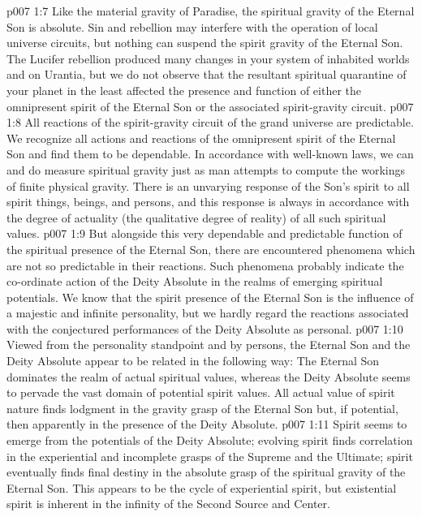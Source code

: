 \vs p007 1:7 \pc Like the material gravity of Paradise, the spiritual gravity of the Eternal Son is absolute. Sin and rebellion may interfere with the operation of local universe circuits, but nothing can suspend the spirit gravity of the Eternal Son. The Lucifer rebellion produced many changes in your system of inhabited worlds and on Urantia, but we do not observe that the resultant spiritual quarantine of your planet in the least affected the presence and function of either the omnipresent spirit of the Eternal Son or the associated spirit\hyp{}gravity circuit.
\vs p007 1:8 \pc All reactions of the spirit\hyp{}gravity circuit of the grand universe are predictable. We recognize all actions and reactions of the omnipresent spirit of the Eternal Son and find them to be dependable. In accordance with well\hyp{}known laws, we can and do measure spiritual gravity just as man attempts to compute the workings of finite physical gravity. There is an unvarying response of the Son’s spirit to all spirit things, beings, and persons, and this response is always in accordance with the degree of actuality (the qualitative degree of reality) of all such spiritual values.
\vs p007 1:9 But alongside this very dependable and predictable function of the spiritual presence of the Eternal Son, there are encountered phenomena which are not so predictable in their reactions. Such phenomena probably indicate the co\hyp{}ordinate action of the Deity Absolute in the realms of emerging spiritual potentials. We know that the spirit presence of the Eternal Son is the influence of a majestic and infinite personality, but we hardly regard the reactions associated with the conjectured performances of the Deity Absolute as personal.
\vs p007 1:10 \pc Viewed from the personality standpoint and by persons, the Eternal Son and the Deity Absolute appear to be related in the following way: The Eternal Son dominates the realm of actual spiritual values, whereas the Deity Absolute seems to pervade the vast domain of potential spirit values. All actual value of spirit nature finds lodgment in the gravity grasp of the Eternal Son but, if potential, then apparently in the presence of the Deity Absolute.
\vs p007 1:11 Spirit seems to emerge from the potentials of the Deity Absolute; evolving spirit finds correlation in the experiential and incomplete grasps of the Supreme and the Ultimate; spirit eventually finds final destiny in the absolute grasp of the spiritual gravity of the Eternal Son. This appears to be the cycle of experiential spirit, but existential spirit is inherent in the infinity of the Second Source and Center.
